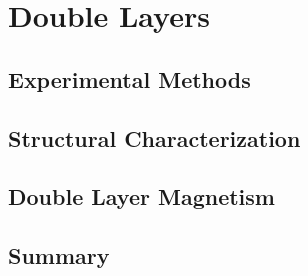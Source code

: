 \documentclass[\main/dresen_thesis.tex]{subfiles}
\renewcommand{\thisPath}{\main/chapters/doublelayers}
\begin{document}
\chapter{Double Layers}\label{ch:doublelayers}
  
  \FloatBarrier
  \clearpage

  \section{Experimental Methods}
    
      \FloatBarrier

  \section{Structural Characterization}
    
    \FloatBarrier

  \section{Double Layer Magnetism}
    
    \FloatBarrier

  \clearpage
  \section{Summary}
    
    \FloatBarrier
\end{document}
